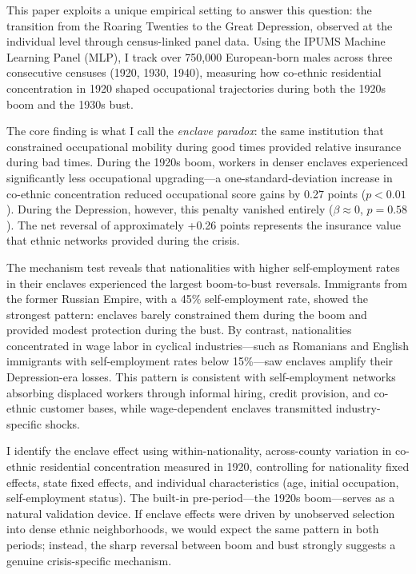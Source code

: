 \documentclass[12pt]{article}
\begin{document}
This paper exploits a unique empirical setting to answer this question: the transition from the Roaring Twenties to the Great Depression, observed at the individual level through census-linked panel data. Using the IPUMS Machine Learning Panel (MLP), I track over 750,000 European-born males across three consecutive censuses (1920, 1930, 1940), measuring how co-ethnic residential concentration in 1920 shaped occupational trajectories during both the 1920s boom and the 1930s bust.

The core finding is what I call the \textit{enclave paradox}: the same institution that constrained occupational mobility during good times provided relative insurance during bad times. During the 1920s boom, workers in denser enclaves experienced significantly less occupational upgrading---a one-standard-deviation increase in co-ethnic concentration reduced occupational score gains by 0.27 points ($p < 0.01$). During the Depression, however, this penalty vanished entirely ($\beta \approx 0$, $p = 0.58$). The net reversal of approximately +0.26 points represents the insurance value that ethnic networks provided during the crisis.

The mechanism test reveals that nationalities with higher self-employment rates in their enclaves experienced the largest boom-to-bust reversals. Immigrants from the former Russian Empire, with a 45\% self-employment rate, showed the strongest pattern: enclaves barely constrained them during the boom and provided modest protection during the bust. By contrast, nationalities concentrated in wage labor in cyclical industries---such as Romanians and English immigrants with self-employment rates below 15\%---saw enclaves amplify their Depression-era losses. This pattern is consistent with self-employment networks absorbing displaced workers through informal hiring, credit provision, and co-ethnic customer bases, while wage-dependent enclaves transmitted industry-specific shocks.

I identify the enclave effect using within-nationality, across-county variation in co-ethnic residential concentration measured in 1920, controlling for nationality fixed effects, state fixed effects, and individual characteristics (age, initial occupation, self-employment status). The built-in pre-period---the 1920s boom---serves as a natural validation device. If enclave effects were driven by unobserved selection into dense ethnic neighborhoods, we would expect the same pattern in both periods; instead, the sharp reversal between boom and bust strongly suggests a genuine crisis-specific mechanism.
\end{document}
